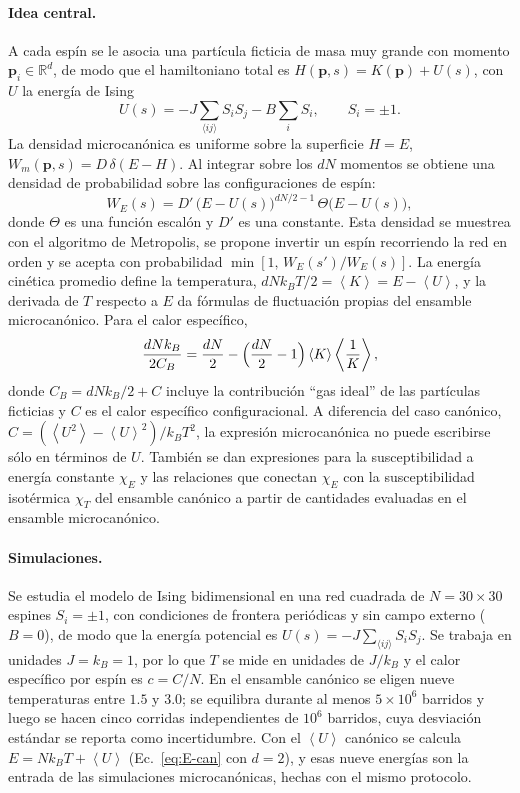 \documentclass[11pt,letterpaper]{article}
\newcommand{\avg}[1]{\left\langle #1 \right\rangle}
\newcommand{\kB}{k_{B}}
\begin{document}
\paragraph{Idea central.}
A cada espín se le asocia una partícula ficticia de masa muy grande con momento
$\bm p_i\in\mathbb R^{d}$, de modo que el hamiltoniano total es
$H(\bm p,s)=K(\bm p)+U(s)$, con $U$ la energía de Ising
\begin{equation}
U(s)=-J\sum_{\langle ij\rangle}S_iS_j-B\sum_i S_i ,\qquad S_i=\pm1 .
\label{eq:U}
\end{equation}
La densidad microcanónica es uniforme sobre la superficie $H=E$,
$W_m(\bm p,s)=D\,\delta(E-H)$. Al integrar sobre los $dN$ momentos se obtiene una
densidad de probabilidad sobre las configuraciones de espín:
\begin{equation}
W_E(s)=D'\,\bigl(E-U(s)\bigr)^{dN/2-1}\,\Theta\bigl(E-U(s)\bigr),
\label{eq:WE}
\end{equation}
donde $\Theta$ es una función escalón y $D'$ es una constante. Esta densidad se muestrea con el algoritmo de Metropolis, se propone invertir
un espín recorriendo la red en orden y se acepta con probabilidad
$\min[1,\,W_E(s')/W_E(s)]$. La energía cinética promedio define la temperatura,
$dN\kB T/2=\avg{K}=E-\avg{U}$, y la derivada de $T$ respecto a $E$ da fórmulas de
fluctuación propias del ensamble microcanónico. Para el calor específico,
\begin{equation}
\frac{dN\kB}{2C_B}=\frac{dN}{2}-\Bigl(\frac{dN}{2}-1\Bigr)\avg{K}\avg{\frac1K},
\label{eq:CB}
\end{equation}
donde $C_B=dN\kB/2+C$ incluye la contribución ``gas ideal'' de las partículas
ficticias y $C$ es el calor específico configuracional. A diferencia del caso
canónico, $C=(\avg{U^2}-\avg{U}^2)/\kB T^2$, la expresión microcanónica no puede
escribirse sólo en términos de $U$. También se dan expresiones para
la susceptibilidad a energía constante $\chi_E$ y las relaciones que conectan $\chi_E$ con la
susceptibilidad isotérmica $\chi_T$ del ensamble canónico a partir de cantidades evaluadas en el ensamble microcanónico.

\paragraph{Simulaciones.}
Se estudia el modelo de Ising bidimensional en una red cuadrada de
$N = 30\times30$ espines $S_i=\pm1$, con condiciones de frontera periódicas y
sin campo externo ($B=0$), de modo que la energía potencial es
$U(s) = -J\sum_{\langle ij\rangle} S_i S_j$. Se trabaja en unidades
$J = \kB = 1$, por lo que $T$ se mide en unidades de $J/\kB$ y el calor
específico por espín es $c = C/N$. En el ensamble canónico se eligen nueve temperaturas
entre $1.5$ y $3.0$; se equilibra durante al menos $5\times10^6$ barridos y luego se
hacen cinco corridas independientes de $10^6$ barridos, cuya desviación estándar
se reporta como incertidumbre. Con el $\avg{U}$ canónico se calcula
$E=N\kB T+\avg U$ (Ec.~\eqref{eq:E-can} con $d=2$), y esas nueve energías son la
entrada de las simulaciones microcanónicas, hechas con el mismo protocolo.
\end{document}
